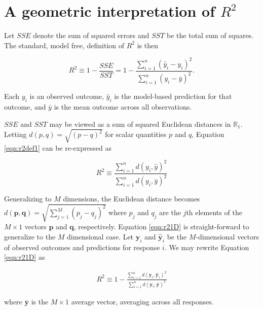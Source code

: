 \hypertarget{a-geometric-interpretation-of-r2}{%
\section{\texorpdfstring{A geometric interpretation of \(R^2\)}{A geometric interpretation of R\^{}2}}\label{a-geometric-interpretation-of-r2}}

Let \(SSE\) denote the sum of squared errors and \(SST\) be the total sum of squares. The standard, model free, definition of \(R^2\) is then

\begin{equation}
\label{eqn:r2def1}
R^2 
\equiv 1 - \frac{SSE}{SST} = 1 - 
\frac{\sum_{i=1}^n{(\hat{y}_i-y_i)^2}}{\sum_{i=1}^n{(y_i-\bar{y})^2}}.
\end{equation}

Each \(y_i\) is an observed outcome, \(\hat{y}_i\) is the model-based prediction for that outcome, and \(\bar{y}\) is the mean outcome across all observations.

\(SSE\) and \(SST\) may be viewed as a sum of squared Euclidean distances in \(\mathbb{R}_1\). Letting \(d(p,q) = \sqrt{(p - q)^2}\) for scalar quantities \(p\) and \(q\), Equation \eqref{eqn:r2def1} can be re-expressed as

\begin{equation}
\label{eqn:r21D}
    R^2 
    \equiv 
    \frac{\sum_{i=1}^n{d(y_i, \hat{y})^2}}{\sum_{i=1}^n{d(y_i,\bar{y})^2}}
\end{equation}

Generalizing to \(M\) dimensions, the Euclidean distance becomes \(d(\boldsymbol{p},\boldsymbol{q}) = \sqrt{\sum_{j=1}^M(p_j - q_j)^2}\) where \(p_j\) and \(q_j\) are the \(j\)th elements of the \(M \times 1\) vectors \(\boldsymbol{p}\) and \(\boldsymbol{q}\), respectively. Equation \eqref{eqn:r21D} is straight-forward to generalize to the \(M\) dimensional case. Let \(\boldsymbol{y}_i\) and \(\hat{\boldsymbol{y}}_i\) be the \(M\)-dimensional vectors of observed outcomes and predictions for response \(i\). We may rewrite Equation \eqref{eqn:r21D} as

\begin{align}
\label{eqn:r2def2}
    R^2 \equiv 
        1 - \frac{\sum_{i=1}^n d(\boldsymbol{y}_i,\hat{\boldsymbol{y}}_i)^2}{\sum_{i=1}^n d(\boldsymbol{y}_i,\bar{\boldsymbol{y}})^2}
\end{align}

where \(\bar{\boldsymbol{y}}\) is the \(M\times 1\) average vector, averaging across all responses.

